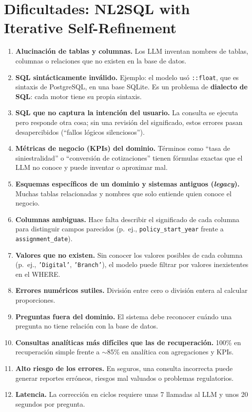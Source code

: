 \documentclass[11pt,a4paper]{article}
\begin{document}
\section{Dificultades: NL2SQL with Iterative Self-Refinement}
\begin{enumerate}
  \item \textbf{Alucinación de tablas y columnas.} Los LLM inventan nombres de tablas, columnas o relaciones que no existen en la base de datos.
  \item \textbf{SQL sintácticamente inválido.} Ejemplo: el modelo usó \texttt{::float}, que es sintaxis de PostgreSQL, en una base SQLite. Es un problema de \textbf{dialecto de SQL}: cada motor tiene su propia sintaxis.
  \item \textbf{SQL que no captura la intención del usuario.} La consulta se ejecuta pero responde otra cosa; sin una revisión del significado, estos errores pasan desapercibidos (``fallos lógicos silenciosos'').
  \item \textbf{Métricas de negocio (KPIs) del dominio.} Términos como ``tasa de siniestralidad'' o ``conversión de cotizaciones'' tienen fórmulas exactas que el LLM no conoce y puede inventar o aproximar mal.
  \item \textbf{Esquemas específicos de un dominio y sistemas antiguos (\textit{legacy}).} Muchas tablas relacionadas y nombres que solo entiende quien conoce el negocio.
  \item \textbf{Columnas ambiguas.} Hace falta describir el significado de cada columna para distinguir campos parecidos (p.\ ej., \texttt{policy\_start\_year} frente a \texttt{assignment\_date}).
  \item \textbf{Valores que no existen.} Sin conocer los valores posibles de cada columna (p.\ ej., \texttt{'Digital'}, \texttt{'Branch'}), el modelo puede filtrar por valores inexistentes en el WHERE.
  \item \textbf{Errores numéricos sutiles.} División entre cero o división entera al calcular proporciones.
  \item \textbf{Preguntas fuera del dominio.} El sistema debe reconocer cuándo una pregunta no tiene relación con la base de datos.
  \item \textbf{Consultas analíticas más difíciles que las de recuperación.} 100\% en recuperación simple frente a $\sim$85\% en analítica con agregaciones y KPIs.
  \item \textbf{Alto riesgo de los errores.} En seguros, una consulta incorrecta puede generar reportes erróneos, riesgos mal valuados o problemas regulatorios.
  \item \textbf{Latencia.} La corrección en ciclos requiere unas 7 llamadas al LLM y unos 20 segundos por pregunta.
\end{enumerate}
\end{document}
